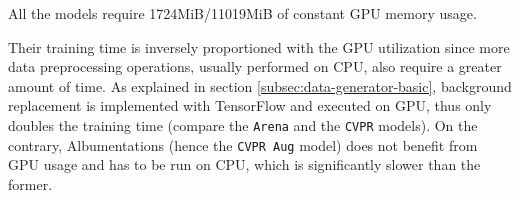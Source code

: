 All the models require 1724MiB/11019MiB of constant GPU memory usage.

Their training time is inversely proportioned with the GPU utilization since more data preprocessing operations, usually performed on CPU, also require a greater amount of time. As explained in section \ref{subsec:data-generator-basic}, background replacement is implemented with TensorFlow and executed on GPU, thus only doubles the training time (compare the \texttt{Arena} and the \texttt{CVPR} models). On the contrary, Albumentations (hence the \texttt{CVPR Aug} model) does not benefit from GPU usage and has to be run on CPU, which is significantly slower than the former.



